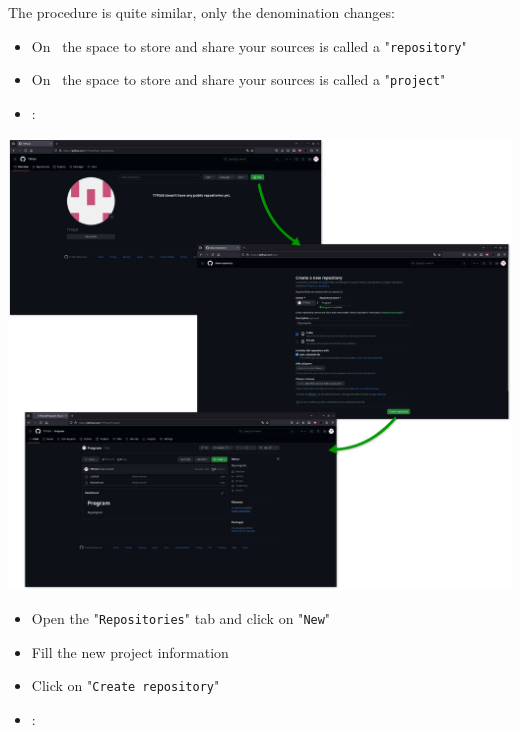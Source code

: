The procedure is quite similar, only the denomination changes: 
\begin{itemize}
\item On \github\ the space to store and share your sources is called a "\texttt{repository}"
\item On \gitlab\ the space to store and share your sources is called a "\texttt{project}"
\end{itemize}
\vspace{0.25cm}
\begin{itemize}
\item \github:
\end{itemize}
\vspace{0.5cm}
\includegraphics[width=1.0\textwidth,keepaspectratio=true,draft=\ddst]{img/hosts/github/new-p.eps} \\[0.25cm]
\begin{itemize}
\item Open the "\texttt{Repositories}" tab and click on "\texttt{New}"
\item Fill the new project information
\item Click on "\texttt{Create repository}"
\end{itemize}
\newpage
\begin{itemize}
\item \gitlab:
\end{itemize}
\vspace{0.5cm}
